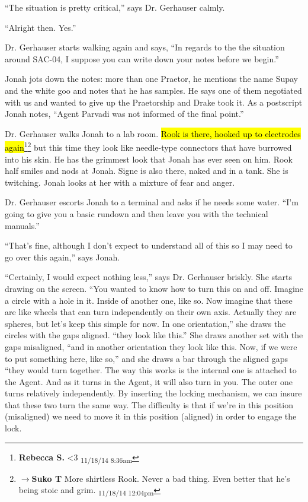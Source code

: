 ``The situation is pretty critical,'' says Dr. Gerhauser calmly.

``Alright then.  Yes.''

Dr. Gerhauser starts walking again and says, ``In regards to the the situation around SAC-04, I suppose you can write down your notes before we begin.''

Jonah jots down the notes: more than one Praetor, he mentions the name Supay and the white goo and notes that he has samples.  He says one of them negotiated with us and wanted to give up the Praetorship and Drake took it.  As a postscript Jonah notes, ``Agent Parvadi was not informed of the final point.''



Dr. Gerhauser walks Jonah to a lab room.  \hl{Rook is there, hooked up to electrodes again}\footnote{\textbf{Rebecca S. }\textless 3 \textsubscript{11/18/14 8:36am}}\footnote{$\rightarrow$\textbf{Suko T }More shirtless Rook.  Never a bad thing.  Even better that he's being stoic and grim. \textsubscript{11/18/14 12:04pm}} but this time they look like needle-type connectors that have burrowed into his skin.  He has the grimmest look that Jonah has ever seen on him.  Rook half smiles and nods at Jonah.  Signe is also there, naked and in a tank.  She is twitching.  Jonah looks at her with a mixture of fear and anger.



Dr. Gerhauser escorts Jonah to a terminal and asks if he needs some water.  ``I'm going to give you a basic rundown and then leave you with the technical manuals.''

``That's fine, although I don't expect to understand all of this so I may need to go over this again,'' says Jonah.

``Certainly, I would expect nothing less,'' says Dr. Gerhauser briskly.  She starts drawing on the screen.  ``You wanted to know how to turn this on and off.  Imagine a circle with a hole in it.  Inside of another one, like so.  Now imagine that these are like wheels that can turn independently on their own axis.  Actually they are spheres, but let's keep this simple for now.  In one orientation,'' she draws the circles with the gaps aligned. ``they look like this.''  She draws another set with the gaps misaligned, ``and in another orientation they look like this. Now, if we were to put something here, like so,'' and she draws a bar through the aligned gaps ``they would turn together.  The way this works is the internal one is attached to the Agent.  And as it turns in the Agent, it will also turn in you.  The outer one turns relatively independently.  By inserting the locking mechanism, we can insure that these two turn the same way. The difficulty is that if we're in this position (misaligned) we need to move it in this position (aligned) in order to engage the lock.

